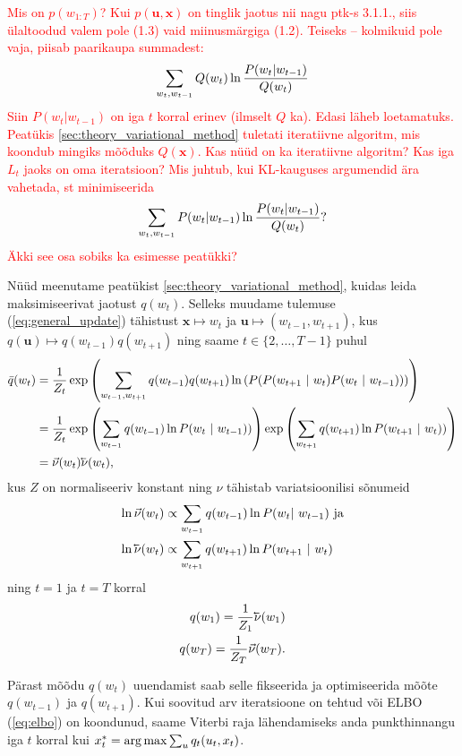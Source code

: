 \textcolor{red}{Mis on $p(w_{1:T})$? Kui $p(\bm{u}, \bm{x})$ on tinglik jaotus nii nagu ptk-s 3.1.1., siis ülaltoodud valem pole (1.3) vaid miinusmärgiga (1.2). Teiseks -- kolmikuid pole vaja, piisab paarikaupa summadest:
$$\sum_{w_t,w_{t-1}} Q(w_t)\ln {P(w_t|w_{t-1})\over Q(w_t)}$$
Siin $P(w_t|w_{t-1})$ on iga $t$ korral erinev (ilmselt $Q$ ka). Edasi läheb loetamatuks. Peatükis \ref{sec:theory_variational_method} tuletati iteratiivne algoritm, mis koondub mingiks mõõduks $Q(\bm{x})$. Kas nüüd on ka iteratiivne algoritm? Kas iga $L_t$ jaoks on oma iteratsioon? Mis juhtub, kui KL-kauguses argumendid ära vahetada, st minimiseerida
$$\sum_{w_t,w_{t-1}} P(w_t|w_{t-1})\ln {P(w_t|w_{t-1})\over Q(w_t)}?$$
Äkki see osa sobiks ka esimesse peatükki? }


Nüüd meenutame peatükist \ref{sec:theory_variational_method}, kuidas leida maksimiseerivat jaotust $q(w_t)$. Selleks muudame tulemuse (\ref{eq:general_update}) tähistust $\bm{x} \mapsto w_t$ ja $\bm{u} \mapsto (w_{t-1},w_{t+1})$, kus $q(\bm{u}) \mapsto q(w_{t-1})q(w_{t+1})$ ning saame $t \in \{2,\ldots,T-1\}$ puhul
\begin{align*}
    \Bar{q}(w_t) &= \frac{1}{Z_t} \exp \left( \sum_{w_{t-1},w_{t+1}} q(w_{t-1})q(w_{t+1}) \ln \left( P(P(w_{t+1} \ |\ w_{t} )P(w_{t}\ |\ w_{t-1})) \right) \right)\\
    &= \frac{1}{Z_t} \exp \left( \sum_{w_{t-1}} q(w_{t-1}) \ln P(w_{t}\ |\ w_{t-1})) \right) \exp \left( \sum_{w_{t+1}} q(w_{t+1}) \ln P(w_{t+1}\ |\ w_{t})) \right)\\
    &= \vec{\nu}(w_t) \cev{\nu}(w_t),
\end{align*}
kus $Z$ on normaliseeriv konstant ning $\nu$ tähistab variatsioonilisi sõnumeid
\begin{align*}
    \ln \vec{\nu}(w_t) &\propto \sum_{w_{t-1}} q(w_{t-1}) \ln P(w_t |\ w_{t-1}) \text{ ja}\\
    \ln \cev{\nu}(w_t) &\propto \sum_{w_{t+1}} q(w_{t+1}) \ln P(w_{t+1}\ |\ w_t)
\end{align*}
ning $t=1$ ja $t=T$ korral
\begin{align*}
    q(w_1) = \frac{1}{Z_1} \cev{\nu}(w_1)\\
    q(w_T) = \frac{1}{Z_T} \vec{\nu}(w_{T}).
\end{align*}

Pärast mõõdu $q(w_t)$ uuendamist saab selle fikseerida ja optimiseerida mõõte $q(w_{t-1})$ ja $q(w_{t+1})$. Kui soovitud arv iteratsioone on tehtud või ELBO (\ref{eq:elbo}) on koondunud, saame Viterbi raja lähendamiseks anda punkthinnangu iga $t$ korral kui $x_t^* = \operatorname*{arg\,max} \sum_{u}{q_t(u_t,x_t)}$.

